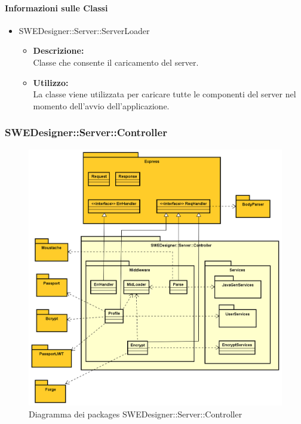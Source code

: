 		\paragraph{Informazioni sulle Classi}
		\begin{itemize}
			\item SWEDesigner::Server::ServerLoader
			\begin{itemize}
				\item \textbf{Descrizione: }\\
				Classe che consente il caricamento del server.
				\item \textbf{Utilizzo: }\\
				La classe viene utilizzata per caricare tutte le componenti del server nel momento dell'avvio dell'applicazione.
			\end{itemize}
		\end{itemize}

		\subsubsection{SWEDesigner::Server::Controller}
		 \begin{figure}[h!]
		\centering
		\includegraphics[scale=0.4]{Disegnetti/SWEDesigner__Server__Controller.png}
		\caption{Diagramma dei packages SWEDesigner::Server::Controller}
 		\end{figure}
